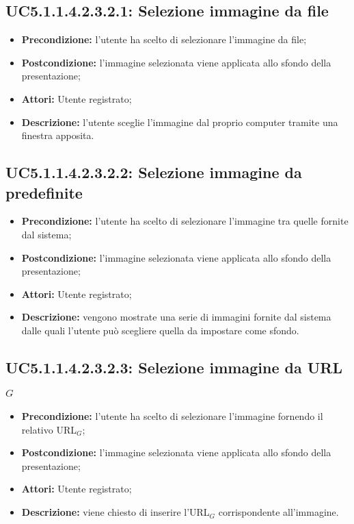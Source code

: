 \subsection{ UC5.1.1.4.2.3.2.1: Selezione immagine da file}

\begin{itemize}
	\item \textbf{Precondizione:} l’utente ha scelto di selezionare l’immagine da file;
	\item \textbf{Postcondizione:} l’immagine selezionata viene applicata allo sfondo della presentazione;
	\item \textbf{Attori:} Utente registrato;
	\item \textbf{Descrizione:} l’utente sceglie l’immagine dal proprio computer tramite una finestra apposita.
\end{itemize}
\subsection{ UC5.1.1.4.2.3.2.2: Selezione immagine da predefinite}

\begin{itemize}
	\item \textbf{Precondizione:} l’utente ha scelto di selezionare l’immagine tra quelle fornite dal sistema;
	\item \textbf{Postcondizione:} l’immagine selezionata viene applicata allo sfondo della presentazione;
	\item \textbf{Attori:} Utente registrato;
	\item \textbf{Descrizione:} vengono mostrate una serie di immagini fornite dal sistema dalle quali l’utente può scegliere quella da impostare come sfondo.
\end{itemize}

\subsection{ UC5.1.1.4.2.3.2.3: Selezione immagine da URL$_G$}

\begin{itemize}
	\item \textbf{Precondizione:} l’utente ha scelto di selezionare l’immagine fornendo il relativo URL$_G$;
	\item \textbf{Postcondizione:} l’immagine selezionata viene applicata allo sfondo della presentazione;
	\item \textbf{Attori:} Utente registrato;
	\item \textbf{Descrizione:} viene chiesto di inserire l’URL$_G$ corrispondente all’immagine.
\end{itemize}

